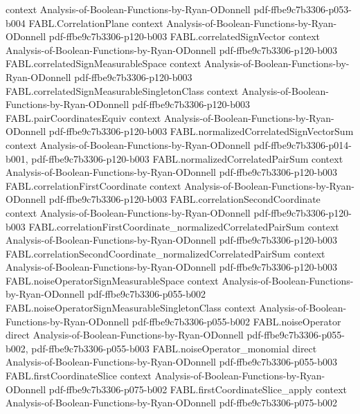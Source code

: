 \begin{theorem}
  {context}
  {Analysis-of-Boolean-Functions-by-Ryan-ODonnell}
  {pdf-ffbe9c7b3306-p053-b004}
\proofstep
  {FABL.CorrelationPlane}
  {context}
  {Analysis-of-Boolean-Functions-by-Ryan-ODonnell}
  {pdf-ffbe9c7b3306-p120-b003}
\proofstep
  {FABL.correlatedSignVector}
  {context}
  {Analysis-of-Boolean-Functions-by-Ryan-ODonnell}
  {pdf-ffbe9c7b3306-p120-b003}
\proofstep
  {FABL.correlatedSignMeasurableSpace}
  {context}
  {Analysis-of-Boolean-Functions-by-Ryan-ODonnell}
  {pdf-ffbe9c7b3306-p120-b003}
\proofstep
  {FABL.correlatedSignMeasurableSingletonClass}
  {context}
  {Analysis-of-Boolean-Functions-by-Ryan-ODonnell}
  {pdf-ffbe9c7b3306-p120-b003}
\proofstep
  {FABL.pairCoordinatesEquiv}
  {context}
  {Analysis-of-Boolean-Functions-by-Ryan-ODonnell}
  {pdf-ffbe9c7b3306-p120-b003}
\proofstep
  {FABL.normalizedCorrelatedSignVectorSum}
  {context}
  {Analysis-of-Boolean-Functions-by-Ryan-ODonnell}
  {pdf-ffbe9c7b3306-p014-b001,
    pdf-ffbe9c7b3306-p120-b003}
\proofstep
  {FABL.normalizedCorrelatedPairSum}
  {context}
  {Analysis-of-Boolean-Functions-by-Ryan-ODonnell}
  {pdf-ffbe9c7b3306-p120-b003}
\proofstep
  {FABL.correlationFirstCoordinate}
  {context}
  {Analysis-of-Boolean-Functions-by-Ryan-ODonnell}
  {pdf-ffbe9c7b3306-p120-b003}
\proofstep
  {FABL.correlationSecondCoordinate}
  {context}
  {Analysis-of-Boolean-Functions-by-Ryan-ODonnell}
  {pdf-ffbe9c7b3306-p120-b003}
\proofstep
  {FABL.correlationFirstCoordinate_normalizedCorrelatedPairSum}
  {context}
  {Analysis-of-Boolean-Functions-by-Ryan-ODonnell}
  {pdf-ffbe9c7b3306-p120-b003}
\proofstep
  {FABL.correlationSecondCoordinate_normalizedCorrelatedPairSum}
  {context}
  {Analysis-of-Boolean-Functions-by-Ryan-ODonnell}
  {pdf-ffbe9c7b3306-p120-b003}
\proofstep
  {FABL.noiseOperatorSignMeasurableSpace}
  {context}
  {Analysis-of-Boolean-Functions-by-Ryan-ODonnell}
  {pdf-ffbe9c7b3306-p055-b002}
\proofstep
  {FABL.noiseOperatorSignMeasurableSingletonClass}
  {context}
  {Analysis-of-Boolean-Functions-by-Ryan-ODonnell}
  {pdf-ffbe9c7b3306-p055-b002}
\proofstep
  {FABL.noiseOperator}
  {direct}
  {Analysis-of-Boolean-Functions-by-Ryan-ODonnell}
  {pdf-ffbe9c7b3306-p055-b002,
    pdf-ffbe9c7b3306-p055-b003}
\proofstep
  {FABL.noiseOperator_monomial}
  {direct}
  {Analysis-of-Boolean-Functions-by-Ryan-ODonnell}
  {pdf-ffbe9c7b3306-p055-b003}
\proofstep
  {FABL.firstCoordinateSlice}
  {context}
  {Analysis-of-Boolean-Functions-by-Ryan-ODonnell}
  {pdf-ffbe9c7b3306-p075-b002}
\proofstep
  {FABL.firstCoordinateSlice_apply}
  {context}
  {Analysis-of-Boolean-Functions-by-Ryan-ODonnell}
  {pdf-ffbe9c7b3306-p075-b002}

\end{theorem}
